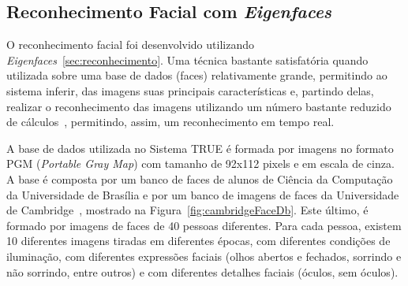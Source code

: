 	\subsection{Reconhecimento Facial com \textit{Eigenfaces}}

		O reconhecimento facial foi desenvolvido utilizando
		\textit{Eigenfaces}~\ref{sec:reconhecimento}. Uma técnica bastante
		satisfatória quando utilizada sobre uma base de dados (faces) relativamente
		grande, permitindo ao sistema inferir, das imagens suas principais
		características e, partindo delas, realizar o reconhecimento das imagens
		utilizando um número bastante reduzido de cálculos~\cite{artigo-eigenface},
		permitindo, assim, um reconhecimento em tempo real.

		A base de dados utilizada no Sistema TRUE é formada por imagens no formato PGM (\textit{Portable Gray Map}) com tamanho de 92x112 pixels e em escala de cinza. A base é composta por um banco de faces de alunos de Ciência da Computação da Universidade de Brasília e por um banco de imagens de faces da Universidade de Cambridge~\cite{cambridgeFaceDb}, mostrado na Figura~\ref{fig:cambridgeFaceDb}. Este último, é formado por imagens de faces de 40 pessoas diferentes. Para cada pessoa, existem 10 diferentes imagens tiradas em diferentes épocas, com diferentes condições de iluminação, com diferentes expressões faciais (olhos abertos e fechados, sorrindo e não sorrindo, entre outros) e com diferentes detalhes faciais (óculos, sem óculos). 

